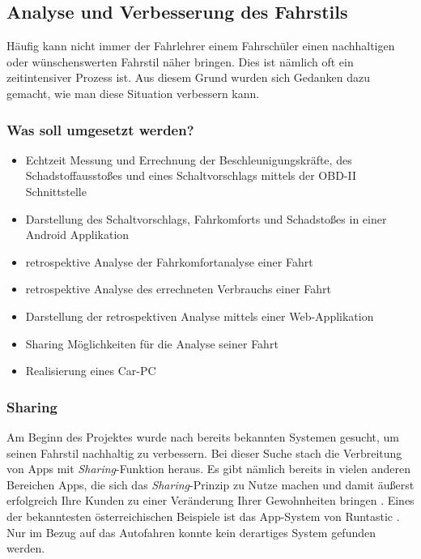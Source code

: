 \subsection{Analyse und Verbesserung des Fahrstils}

Häufig kann nicht immer der Fahrlehrer einem Fahrschüler einen nachhaltigen oder wünschenswerten Fahrstil näher bringen. Dies ist nämlich oft ein zeitintensiver Prozess ist. Aus diesem Grund wurden sich Gedanken dazu gemacht, wie man diese Situation verbessern kann.

\subsubsection{Was soll umgesetzt werden?}
\begin{itemize}
	\item Echtzeit Messung und Errechnung der Beschleunigungskräfte, des Schadstoffausstoßes und eines Schaltvorschlags mittels der OBD-II Schnittstelle
	\item Darstellung des Schaltvorschlags, Fahrkomforts und Schadstoßes in einer Android Applikation
	\item retrospektive Analyse der Fahrkomfortanalyse einer Fahrt
	\item retrospektive Analyse des errechneten Verbrauchs einer Fahrt
	\item Darstellung der retrospektiven Analyse mittels einer Web-Applikation
	\item Sharing Möglichkeiten für die Analyse seiner Fahrt
	\item Realisierung eines Car-PC
\end{itemize}

\subsubsection{Sharing}
Am Beginn des Projektes wurde nach bereits bekannten Systemen gesucht, um seinen Fahrstil nachhaltig zu verbessern. Bei dieser Suche stach die Verbreitung von Apps mit \textit{Sharing}-Funktion heraus. Es gibt nämlich bereits in vielen anderen Bereichen Apps, die sich das \textit{Sharing}-Prinzip zu Nutze machen und damit äußerst erfolgreich Ihre Kunden zu einer Veränderung Ihrer Gewohnheiten bringen \cite{SIMR.CH1-fahrstil-analyse.GewohnheitenLoslassen}. Eines der bekanntesten österreichischen Beispiele ist das App-System von Runtastic \cite{SIMR.CH1-Fahrstil-Analyse.BusinessplanRuntastic}.
Nur im Bezug auf das Autofahren konnte kein derartiges System  gefunden werden.

